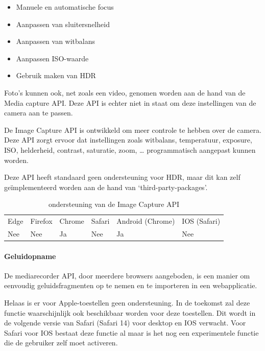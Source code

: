  \begin{itemize}
     \item Manuele en automatische focus
     \item Aanpassen van sluitersnelheid
     \item Aanpassen van witbalans
     \item Aanpassen ISO-waarde
     \item Gebruik maken van HDR 
   \end{itemize}

Foto’s kunnen ook, net zoals een video, genomen worden aan de hand van de Media capture API. Deze API is echter niet in staat om deze instellingen van de camera aan te passen.

De Image Capture API \autocite{Mandyam2020} is ontwikkeld om meer controle te hebben over de camera. Deze API zorgt ervoor dat instellingen zoals witbalans, temperatuur, exposure, ISO, helderheid, contrast, saturatie, zoom, … programmatisch aangepast kunnen worden.

Deze API heeft standaard geen ondersteuning voor HDR, maar dit kan zelf geïmplementeerd worden aan de hand van ‘third-party-packages’.

\autocite{Bhaumik2019}

\begin{table}[H]
	\centering
	\begin{tabular}{llllll}
		Edge & Firefox & Chrome & Safari & Android (Chrome) & IOS (Safari) \\
		Nee   & Nee      & Ja     & Nee     & Ja               & Nee          
	\end{tabular}	
	\caption{ondersteuning van de Image Capture API}
\end{table}



\paragraph{Geluidopname }



De mediarecorder API, \autocite{CasasSanchez2020} door meerdere browsers aangeboden, is een manier om eenvoudig geluidsfragmenten op te nemen en te importeren in een webapplicatie.

Helaas is er voor Apple-toestellen geen ondersteuning. In de toekomst zal deze functie waarschijnlijk ook beschikbaar worden voor deze toestellen. Dit wordt in de volgende versie van Safari (Safari 14) voor desktop en IOS verwacht. Voor Safari voor IOS bestaat deze functie al maar is het nog een experimentele functie die de gebruiker zelf moet activeren.


